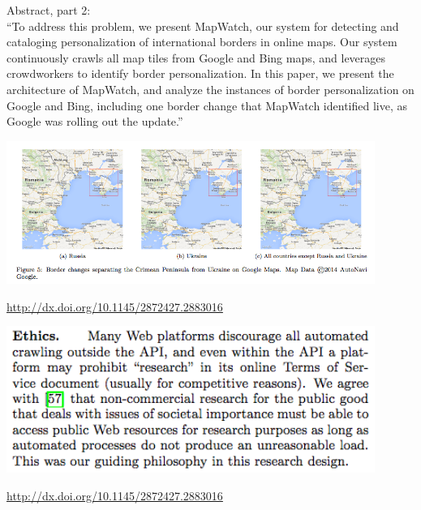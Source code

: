 \documentclass{beamer}
\def\vf{\vfill}
\begin{document}
\begin{frame}

Abstract, part 2:\\
``To address this problem, we present MapWatch, our system for detecting and cataloging personalization of international borders in online maps. Our system continuously crawls all map tiles from Google and Bing maps, and leverages crowdworkers to identify border personalization. In this paper, we present the architecture of MapWatch, and analyze the instances of border personalization on Google and Bing, including one border change that MapWatch identified live, as Google was rolling out the update.''

\end{frame}
\begin{frame}

\begin{center}
\includegraphics[width=0.9\textwidth]{figures/soeller_mapwatch_2016_fig5.png}
\end{center}

\vf
\url{http://dx.doi.org/10.1145/2872427.2883016}
\end{frame}
\begin{frame}

\begin{center}
\includegraphics[width=0.9\textwidth]{figures/soeller_mapwatch_2016_ethics.png}
\end{center}

\vf
\url{http://dx.doi.org/10.1145/2872427.2883016}
\end{frame}
\end{document}
